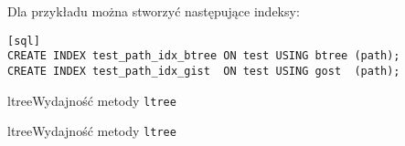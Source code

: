 Dla przykładu można stworzyć następujące indeksy:
\begin{verbatim}[sql]
CREATE INDEX test_path_idx_btree ON test USING btree (path);
CREATE INDEX test_path_idx_gist  ON test USING gost  (path);
\end{verbatim}













\begin{qxtab}{ltree}{Wydajność metody \texttt{ltree}}
\end{qxtab}

\begin{qxfig}{ltree}{Wydajność metody \texttt{ltree}}
\end{qxfig}







